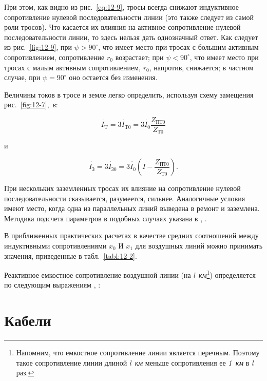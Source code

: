 При этом, как видно из рис.~\ref{eq:12-9}, тросы всегда снижают индуктивное сопротивление нулевой последовательности линии (это также следует из самой роли тросов). Что касается их влияния на активное сопротивление нулевой последовательности линии, то здесь нельзя дать однозначный ответ. Как следует из рис.~\ref{fig:12-9}, при $ \psi > 90^\circ $, что имеет место при тросах с большим активным сопротивлением, сопротивление $ r_0 $ возрастает; при $ \psi < 90^\circ $, что имеет место при тросах с малым активным сопротивлением, $ r_0 $, напротив, снижается; в частном случае, при  $ \psi = 90^\circ $ оно остается без изменения.

Величины токов в тросе и земле легко определить, используя схему замещения рис.~\ref{fig:12-7},~\textit{в}:

\begin{equation}
	\overset{~\cdot}{I}_{\text{T}} = 3 \overset{~\cdot}{I}_{\text{T}0} = 3 \overset{~\cdot}{I}_0 \frac{Z_{\text{ПТ0}}}{Z_{\text{Т0}}}
	\label{eq:12-32}
\end{equation}

и

\begin{equation}
	\overset{~\cdot}{I}_{\text{З}} = 3 \overset{~\cdot}{I}_{\text{З}0} = 3 \overset{~\cdot}{I}_0 (I - \frac{Z_{\text{ПТ0}}}{Z_{\text{Т0}}} ) \text{.}
	\label{eq:12-33}
\end{equation}

При нескольких заземленных тросах их влияние на сопротивление нулевой последовательности сказывается, разумеется, сильнее. Аналогичные условия имеют место, когда одна из параллельных линий выведена в ремонт и заземлена. Методика подсчета параметров в подобных случаях указана в \cite{03Shchedrin55}, \cite{05Ulianov64}.

В приближенных практических расчетах в качестве средних соотношений между индуктивными сопротивлениями $ x_0 $ И $ x_1 $ для воздушных линий можно принимать значения, приведенные в табл.~\ref{tabl:12-2}.

Реактивное емкостное сопротивление воздушной линии (на \textit{l~км}\footnote{Напомним, что емкостное сопротивление линии является перечным. Поэтому такое сопротивление линии длиной \textit{l~км} меньше сопротивления ее \textit{1~км} в \textit{l} раз.}) определяется по следующим выражениям \cite{02Shchedrin35}, \cite{09Vagner36}:










\section{Кабели}
\label{sec:12-8}
































